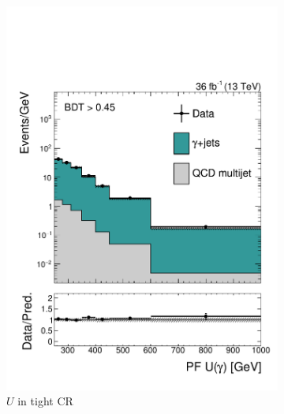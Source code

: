 \begin{figure}[]
\begin{center}
\begin{subfigure}[t]{0.32\textwidth}
            \includegraphics[width=\textwidth]{figures/monotop/prefit/photon_tight_pfUAmag_logy.pdf}
            \caption{$U$ in tight CR}
        \end{subfigure}
        \begin{subfigure}[t]{0.32\textwidth}

\end{subfigure}
\end{center}
\end{figure}
